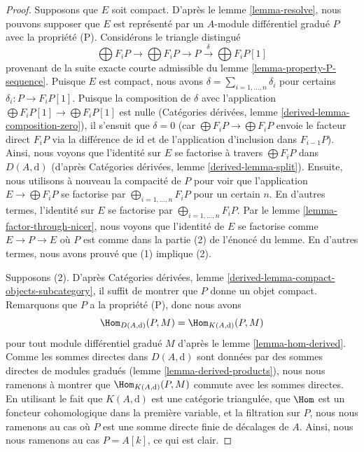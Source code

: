 \begin{proof}
Supposons que $E$ soit compact. D'après le lemme \ref{lemma-resolve}, nous pouvons
supposer que $E$ est représenté par un $A$-module différentiel gradué $P$ avec la
propriété (P). Considérons le triangle distingué
$$
\bigoplus F_iP \to \bigoplus F_iP \to P
\xrightarrow{\delta} \bigoplus F_iP[1]
$$
provenant de la suite exacte courte admissible du lemme
\ref{lemma-property-P-sequence}. Puisque $E$ est compact, nous avons
$\delta = \sum_{i = 1, \ldots, n} \delta_i$ pour certains
$\delta_i : P \to F_iP[1]$. Puisque la composition de $\delta$ avec
l'application $\bigoplus F_iP[1] \to \bigoplus F_iP[1]$ est nulle (Catégories
dérivées, lemme \ref{derived-lemma-composition-zero}), il s'ensuit que
$\delta = 0$ (car $\bigoplus F_iP \to \bigoplus F_iP$ envoie le facteur direct $F_iP$
via la différence de $\text{id}$ et de l'application d'inclusion dans $F_{i - 1}P$).
Ainsi, nous voyons que
l'identité sur $E$ se factorise à travers $\bigoplus F_iP$ dans
$D(A, \text{d})$ (d'après Catégories
dérivées, lemme \ref{derived-lemma-split}). Ensuite, nous utilisons
à nouveau la compacité de $P$ pour voir que l'application $E \to
\bigoplus F_iP$ se factorise par $\bigoplus_{i = 1, \ldots, n} F_iP$ pour un
certain $n$. En d'autres termes, l'identité sur $E$ se factorise par
$\bigoplus_{i = 1, \ldots, n} F_iP$. Par le lemme
\ref{lemma-factor-through-nicer}, nous voyons
que l'identité de $E$ se factorise comme $E \to P \to E$ où $P$ est
comme dans la partie (2) de l'énoncé du lemme. En d'autres termes,
nous avons prouvé que (1) implique (2).

\medskip\noindent
Supposons (2).
D'après Catégories dérivées, lemme
\ref{derived-lemma-compact-objects-subcategory}, il suffit de montrer que $P$ donne un objet compact. Remarquons que
$P$ a la propriété (P), donc nous avons
$$
\Hom_{D(A, \text{d})}(P, M) = \Hom_{K(A, \text{d})}(P, M)
$$
pour tout module différentiel gradué $M$ d'après le lemme \ref{lemma-hom-derived}.
Comme les sommes directes dans $D(A, \text{d})$ sont données par des sommes
directes de modules gradués (lemme \ref{lemma-derived-products}), nous
nous ramenons à montrer que $\Hom_{K(A, \text{d})}(P, M)$ commute avec les sommes
directes. En utilisant le fait que $K(A, \text{d})$ est une catégorie
triangulée, que $\Hom$ est un foncteur cohomologique dans la
première variable, et la filtration sur $P$, nous nous ramenons au cas où $P$
est une somme directe finie de décalages de $A$. Ainsi, nous nous ramenons
au cas $P = A[k]$, ce qui est clair.
\end{proof}

